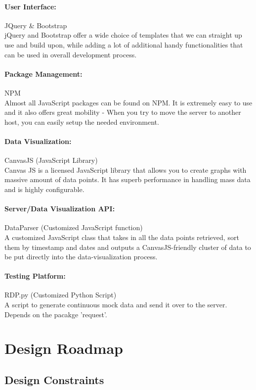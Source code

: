 \documentclass{article}
\begin{document}
\paragraph{User Interface:} JQuery \& Bootstrap\\
jQuery and Bootstrap offer a wide choice of templates that we can straight up use and build upon, while adding a lot of additional 
handy functionalities that can be used in overall development process.
\paragraph{Package Management:} NPM\\
Almost all JavaScript packages can be found on NPM. It is extremely easy to use and it also offers great mobility - When 
you try to move the server to another host, you can easily setup the needed environment.
\paragraph{Data Visualization:} CanvasJS (JavaScript Library)\\
Canvas JS is a licensed JavaScript library that allows you to create graphs with massive amount of data points. It has superb performance in 
handling mass data and is highly configurable.
\paragraph{Server/Data Visualization API: } DataParser (Customized JavaScript function)\\
A customized JavaScript class that takes in all the data points retrieved, sort them by timestamp and dates and outputs a CanvasJS-friendly
cluster of data to be put directly into the data-visualization process.
\paragraph{Testing Platform: } RDP.py (Customized Python Script)\\
A script to generate continuous mock data and send it over to the server. Depends on the pacakge 'request'.

\newpage
\section{Design Roadmap}
\subsection{Design Constraints}
\end{document}
